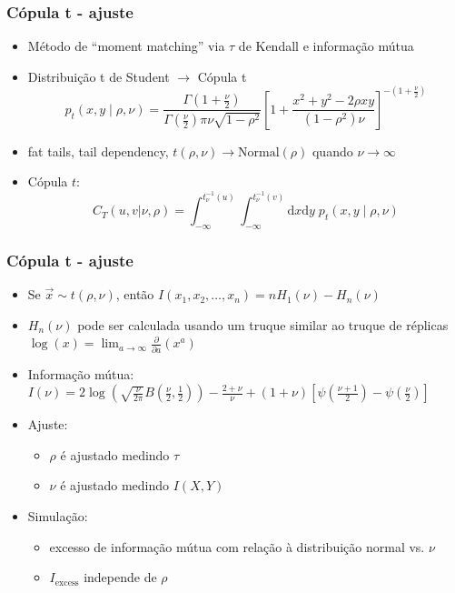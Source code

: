 \documentclass[ignorenonframetext,]{beamer}
\begin{document}
\begin{frame}\frametitle{Cópula t - ajuste}

\begin{itemize}
\itemsep1pt\parskip0pt
\item
  Método de ``moment matching'' via $\tau$ de Kendall e informação mútua
\item
  Distribuição t de Student $\to$ Cópula t
  \[p_{t}(x,y\mid  \rho, \nu) = \frac{\Gamma(1+\frac{\nu}{2})}{\Gamma(\frac{\nu}{2}){\pi\nu\sqrt{1-\rho^2}}}\left[1+ \frac{x^2+ y^2 - 2\rho xy}{(1-\rho^2)\nu}\right]^{-(1+\frac{\nu}{2})}\]
\item
  fat tails, tail dependency, $t(\rho, \nu) \to \mathrm{Normal}(\rho)$
  quando $\nu\to\infty$
\item
  Cópula $t$:
  \[C_{T}(u,v\vert \nu, \rho) = \int_{-\infty}^{t_\nu^{-1}(u)} \int_{-\infty}^{t_\nu^{-1}(v)} \mathrm{d} x \mathrm{d}y \; p_{t}(x, y \mid \rho, \nu)\]
\end{itemize}

\end{frame}

\begin{frame}\frametitle{Cópula t - ajuste}

\begin{itemize}
\itemsep1pt\parskip0pt
\item
  Se $\vec{x} \sim t(\rho, \nu)$, então
  $I(x_1, x_2, \ldots, x_n) = n H_{1}(\nu) - H_n(\nu)$
\item
  $H_{n}(\nu)$ pode ser calculada usando um truque similar ao truque de
  réplicas
  $\log(x) = \lim_{a\to\infty}\frac{\partial}{\partial a} (x^a)$
\item
  Informação mútua:
  $I(\nu) = 2\log\left(\sqrt{\frac{\nu}{2\pi}}B\left(\frac{\nu}{2},\frac{1}{2}\right) \right) - \frac{2+\nu}{\nu} + (1+\nu)\left[ \psi \left(\frac{\nu+1}{2}\right) - \psi \left(\frac{\nu}{2}\right) \right]$
\item
  Ajuste:

  \begin{itemize}
  \itemsep1pt\parskip0pt
  \item
    $\rho$ é ajustado medindo $\tau$
  \item
    $\nu$ é ajustado medindo $I(X,Y)$
  \end{itemize}
\item
  Simulação:

  \begin{itemize}
  \itemsep1pt\parskip0pt
  \item
    excesso de informação mútua com relação à distribuição normal vs.
    $\nu$
  \item
    $I_\text{excess}$ independe de $\rho$
  \end{itemize}
\end{itemize}

\end{frame}
\end{document}
